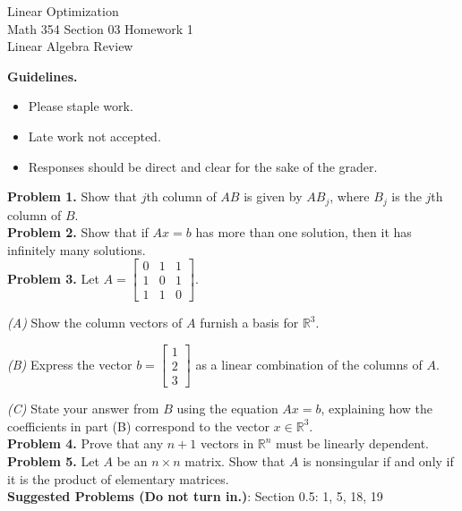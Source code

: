 \documentclass[11pt]{article}
\newcommand{\R}{\mathbb{R}}
\newcommand{\Matrix}[1]{\begin{bmatrix}#1\end{bmatrix}}
\begin{document}
\begin{center}
Linear Optimization\\
Math 354 Section 03 Homework 1\\
Linear Algebra Review
\end{center}

\noindent \textbf{Guidelines.} 
\begin{itemize} 
\item Please staple work. 
\item Late work not accepted.
\item Responses should be direct and clear for the sake of the grader. 
\end{itemize}

\noindent \textbf{Problem 1.} Show that $j$th column of $AB$ is given by $AB_j$, where $B_j$ is the $j$th column of $B$.\\

\noindent \textbf{Problem 2.} Show that if $Ax = b$ has more than one solution, then it has infinitely many solutions. \\

\noindent \textbf{Problem 3.} Let $A = \Matrix{ 0 & 1 & 1 \\ 1 & 0 & 1 \\ 1 & 1 & 0}$. 

\emph{(A)} Show the column vectors of $A$ furnish a basis for $\R^3$. 

\emph{(B)} Express the vector $b = \Matrix{1 \\ 2 \\ 3}$ as a linear combination of the columns of $A$.

\emph{(C)} State your answer from $B$ using the equation $Ax = b$, explaining how the coefficients in part (B) correspond to the vector $x \in \R^3$. \\

\noindent \textbf{Problem 4.} Prove that any $n+1$ vectors in $\R^n$ must be linearly dependent. \\

\noindent \textbf{Problem 5.} Let $A$ be an $n \times n$ matrix. Show that $A$ is nonsingular if and only if it is the product of elementary matrices. \\

\noindent \textbf{Suggested Problems (Do not turn in.)}:
Section 0.5: 1, 5, 18, 19\\
\end{document}
